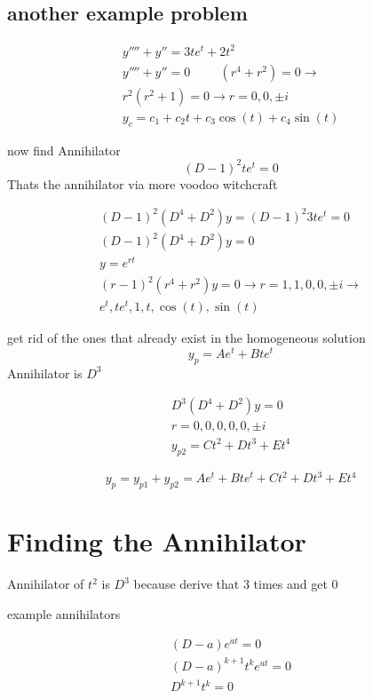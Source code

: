 \documentclass[fleqn]{report}
\newcommand{\hp}{\hspace{1cm}}
\newcommand{\equations} [1] {
\begin{gather*}
#1
\end{gather*}
}
\begin{document}
 
 \subsection{another example problem}
 \equations{
 y'''' + y'' = 3te^t + 2t^2
 \\
 y'''' + y'' = 0
 \hp
 (r^4 + r^2) = 0
 \rightarrow
 \\
 r^2 (r^2 + 1) = 0
 \rightarrow r = 0, 0, \pm i
 \\
 y_c = c_1 + c_2t + c_3 \cos (t) + c_4 \sin (t)
 }
 now find Annihilator
 \[
 (D - 1)^2te^t = 0
 \]
 Thats the annihilator via more voodoo witchcraft
 \equations{
(D - 1)^2 (D^4 + D^2)y = (D - 1)^2 3te^t = 0
\\
(D - 1)^2 (D^4 + D^2)y = 0
\\
y = e^{rt}
\\
(r - 1)^2 (r^4 + r^2)y = 0
\rightarrow
r = 1, 1, 0, 0, \pm i
\rightarrow
\\
e^t, te^t, 1, t, \cos(t), \sin(t)
 }
 get rid of the ones that already exist in the homogeneous solution
 \[
 y_p = A e^t + Bte^t
 \]
 Annihilator is $D^3$
 \equations{
 D^3(D^4 + D^2)y = 0
 \\
 r = 0, 0, 0, 0, 0, \pm i
 \\
 y_{p2} = Ct^2 + Dt^3 + Et^4
 }
 \[
 y_p = y_{p1} + y_{p2}
 =
 A e^t + Bte^t
 + Ct^2 + Dt^3 + Et^4
 \]
 
 
 
 \section{Finding the Annihilator}
 Annihilator of $t^2$ is $D^3$ because derive that 3 times and get 0
 
 example annihilators
 \equations{
 (D - a)e^{at} = 0
 \\
 (D - a)^{k + 1}t^ke^{at} = 0
 \\
 D^{k + 1}t^k = 0
 }
 
 \newpage
\end{document}
